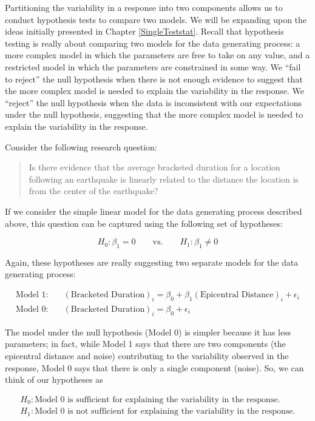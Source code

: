 \documentclass[
]{book}
\theoremstyle{plain}
\theoremstyle{mydefn}
\theoremstyle{myexmpl}
\theoremstyle{remark}
\begin{document}
Partitioning the variability in a response into two components allows us to conduct hypothesis tests to compare two models. We will be expanding upon the ideas initially presented in Chapter \ref{SingleTeststat}. Recall that hypothesis testing is really about comparing two models for the data generating process: a more complex model in which the parameters are free to take on any value, and a restricted model in which the parameters are constrained in some way. We ``fail to reject'' the null hypothesis when there is not enough evidence to suggest that the more complex model is needed to explain the variability in the response. We ``reject'' the null hypothesis when the data is inconsistent with our expectations under the null hypothesis, suggesting that the more complex model is needed to explain the variability in the response.

Consider the following research question:

\begin{quote}
Is there evidence that the average bracketed duration for a location following an earthquake is linearly related to the distance the location is from the center of the earthquake?
\end{quote}

If we consider the simple linear model for the data generating process described above, this question can be captured using the following set of hypotheses:

\[H_0: \beta_1 = 0 \qquad \text{vs.} \qquad H_1: \beta_1 \neq 0\]

Again, these hypotheses are really suggesting two separate models for the data generating process:

\[
\begin{aligned}
  \text{Model 1}:& \quad (\text{Bracketed Duration})_i = \beta_0 + \beta_1 (\text{Epicentral Distance})_i + \epsilon_i \\
  \text{Model 0}:& \quad (\text{Bracketed Duration})_i = \beta_0 + \epsilon_i
\end{aligned}
\]

The model under the null hypothesis (Model 0) is simpler because it has less parameters; in fact, while Model 1 says that there are two components (the epicentral distance and noise) contributing to the variability observed in the response, Model 0 says that there is only a single component (noise). So, we can think of our hypotheses as

\[
\begin{aligned}
  H_0: \text{Model 0 is sufficient for explaining the variability in the response.} \\
  H_1: \text{Model 0 is not sufficient for explaining the variability in the response.}
\end{aligned}
\]
\end{document}
